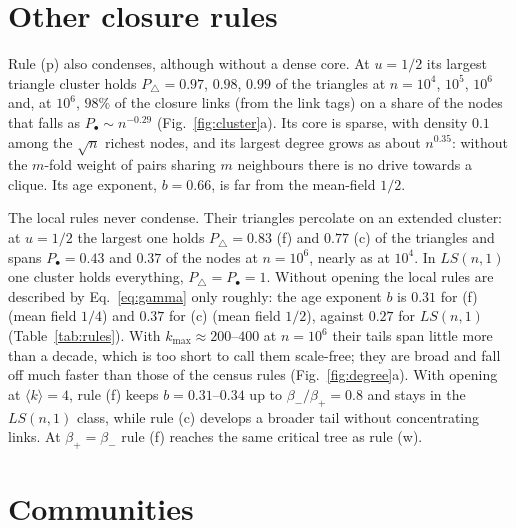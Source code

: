 \documentclass[aps,pre,twocolumn,superscriptaddress,floatfix,nofootinbib]{revtex4-2}
\begin{document}
\section{Other closure rules}
\label{sec:local}

Rule (p) also condenses, although without a dense core. At $u=1/2$ its largest
triangle cluster holds $P_\triangle=0.97$, $0.98$, $0.99$ of the triangles at
$n=10^4$, $10^5$, $10^6$ and, at $10^6$, $98\%$ of the closure links (from the
link tags) on a share of the nodes that falls as $P_\bullet\sim n^{-0.29}$
(Fig.~\ref{fig:cluster}a). Its core is sparse, with density $0.1$ among the
$\sqrt n$ richest nodes, and its largest degree grows as about $n^{0.35}$:
without the $m$-fold weight of pairs sharing $m$ neighbours there is no drive
towards a clique. Its age exponent, $b=0.66$, is far from the mean-field $1/2$.

The local rules never condense. Their triangles percolate on an extended
cluster: at $u=1/2$ the largest one holds $P_\triangle=0.83$ (f) and $0.77$ (c)
of the triangles and spans $P_\bullet=0.43$ and $0.37$ of the nodes at
$n=10^6$, nearly as at $10^4$. In $LS(n,1)$ one cluster holds everything,
$P_\triangle=P_\bullet=1$. Without opening the local rules are
described by Eq.~\eqref{eq:gamma} only roughly: the age exponent $b$ is $0.31$
for (f) (mean field $1/4$) and $0.37$ for (c) (mean field $1/2$), against
$0.27$ for $LS(n,1)$ (Table~\ref{tab:rules}). With $k_{\max}\approx200$--$400$
at $n=10^6$ their tails span little more than a decade, which is too short to
call them scale-free; they are broad and fall off much faster than those of
the census rules (Fig.~\ref{fig:degree}a). With opening at
$\langle k\rangle=4$, rule (f) keeps $b=0.31$--$0.34$ up to $\beta_-/\beta_+=0.8$
and stays in the $LS(n,1)$ class, while rule (c) develops a broader tail
without concentrating links. At $\beta_+=\beta_-$ rule (f) reaches the same
critical tree as rule (w).

\section{Communities}
\label{sec:mixing}
\end{document}
